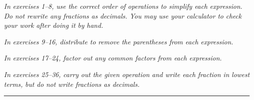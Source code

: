 \begin{exercises}
\textit{In exercises 1--8, use the correct order of operations to simplify each expression.  Do not rewrite any fractions as decimals.  You may use your calculator to check your work after doing it by hand.}



\textit{In exercises 9--16, distribute to remove the parentheses from each expression.}



\textit{In exercises 17--24, factor out any common factors from each expression.}



\textit{In exercises 25--36, carry out the given operation and write each fraction in lowest terms, but do not write fractions as decimals.}




\vspace*{0.25in}

{\color{blue!60!black} \rule{\textwidth}{3pt}}
\vspace*{0.25in}


\end{exercises}

